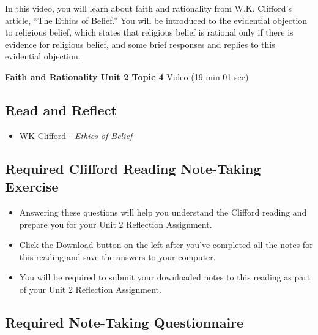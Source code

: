 \documentclass[
]{book}
\providecommand{\tightlist}{%
  \setlength{\itemsep}{0pt}\setlength{\parskip}{0pt}}
\begin{document}
In this video, you will learn about faith and rationality from W.K. Clifford's article, ``The Ethics of Belief.'' You will be introduced to the evidential objection to religious belief, which states that religious belief is rational only if there is evidence for religious belief, and some brief responses and replies to this evidential objection.

\textbf{Faith and Rationality Unit 2 Topic 4} Video (19 min 01 sec)

\hypertarget{read-and-reflect-6}{%
\subsection*{Read and Reflect}\label{read-and-reflect-6}}

\begin{itemize}
\tightlist
\item
  WK Clifford - \href{assets/u2/PHIL-100-Clifford-Ethics-of-Belief.pdf}{\emph{Ethics of Belief}}
\end{itemize}

\hypertarget{required-clifford-reading-note-taking-exercise}{%
\subsection*{Required Clifford Reading Note-Taking Exercise}\label{required-clifford-reading-note-taking-exercise}}

\begin{reflect}
\begin{itemize}
\tightlist
\item
  Answering these questions will help you understand the Clifford reading and prepare you for your Unit 2 Reflection Assignment.
\item
  Click the Download button on the left after you've completed all the notes for this reading and save the answers to your computer.
\item
  You will be required to submit your downloaded notes to this reading as part of your Unit 2 Reflection Assignment.
\end{itemize}
\end{reflect}

\hypertarget{required-note-taking-questionnaire-7}{%
\subsection*{Required Note-Taking Questionnaire}\label{required-note-taking-questionnaire-7}}
\end{document}
